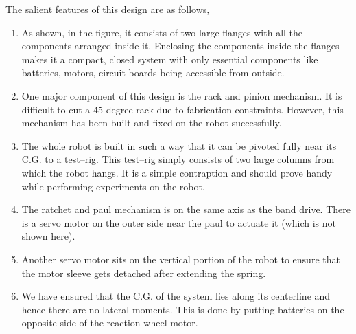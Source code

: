 The salient features of this design are as follows,
\begin{enumerate}
  \item 
  As shown, in the figure, it consists of two large flanges with all the components arranged inside it. Enclosing the components inside the flanges makes it a compact, closed system with only essential components like batteries, motors, circuit boards being accessible from outside.
  \item
  One major component of this design is the rack and pinion mechanism. It is difficult to cut a 45 degree rack due to fabrication constraints. However, this mechanism has been built and fixed on the robot successfully.
  \item
  The whole robot is built in such a way that it can be pivoted fully near its C.G. to a test--rig. This test--rig simply consists of two large columns from which the robot hangs. It is a simple contraption and should prove handy while performing experiments on the robot.
  \item
  The ratchet and paul mechanism is on the same axis as the band drive. There is a servo motor on the outer side near the paul to actuate it (which is not shown here).
  \item
  Another servo motor sits on the vertical portion of the robot to ensure that the motor sleeve gets detached after extending the spring.
  \item
  We have ensured that the C.G. of the system lies along its centerline and hence there are no lateral moments. This is done by putting batteries on the opposite side of the reaction wheel motor.
\end{enumerate}

